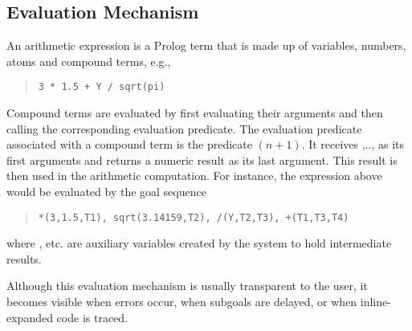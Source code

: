 \subsection{Evaluation Mechanism}

An arithmetic expression is a Prolog term that is made up of variables,
numbers, atoms and compound terms, e.g.,
\begin{quote}
\begin{verbatim}
3 * 1.5 + Y / sqrt(pi)
\end{verbatim}\end{quote}
Compound terms are evaluated by first evaluating their arguments and then
calling the corresponding evaluation predicate.
The evaluation predicate associated with a compound term
is the predicate $(n+1)$. It receives
,.., as its first
 arguments and returns a numeric result as its last argument.
This result is then used in the arithmetic computation.
For instance, the expression above would be evaluated by the goal sequence
\begin{quote}
\begin{verbatim}
*(3,1.5,T1), sqrt(3.14159,T2), /(Y,T2,T3), +(T1,T3,T4)
\end{verbatim}\end{quote}
where ,  etc. are auxiliary variables created by the system
to hold
intermediate results.

Although this evaluation mechanism is usually transparent to the user, it
becomes visible when errors occur, when subgoals are delayed, or
when inline-expanded code is traced.

